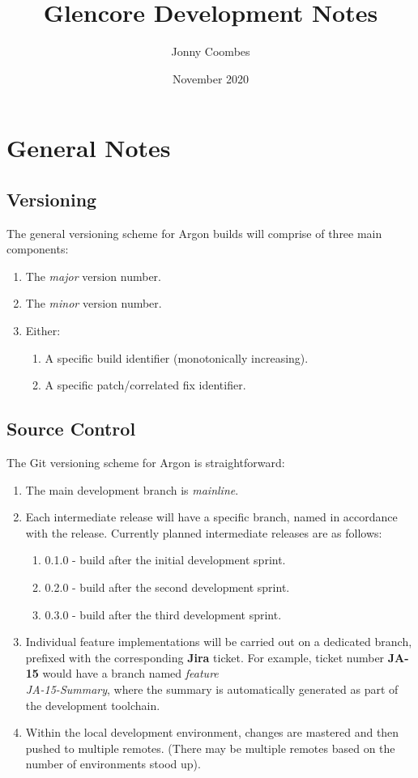 \documentclass{book}
\title{Glencore Development Notes}
\author{Jonny Coombes}
\date{November 2020}
\begin{document}
\maketitle
{}
\newpage
\tableofcontents
\newpage
{}

\chapter{General Notes}
\hoffset=0in
\evensidemargin=0in
\section{Versioning}
The general versioning scheme for Argon builds will comprise of three main components:
\begin{enumerate}
    \item The \textit{major} version number.
    \item The \textit{minor} version number.
    \item Either:
    \begin{enumerate}
        \item A specific build identifier (monotonically increasing).
        \item A specific patch/correlated fix identifier.
    \end{enumerate}
\end{enumerate}

\section{Source Control}
The Git versioning scheme for Argon is straightforward:
\begin{enumerate}
    \item The main development branch is \textit{mainline}.
    \item Each intermediate release will have a specific branch, named in accordance with the release.  Currently planned intermediate releases are as follows:
    \begin{enumerate}
        \item 0.1.0 - build after the initial development sprint.
        \item 0.2.0 - build after the second development sprint.
        \item 0.3.0 - build after the third development sprint.
    \end{enumerate}
    \item Individual feature implementations will be carried out on a dedicated branch, prefixed with the corresponding \textbf{Jira} ticket.  For example, ticket number \textbf{JA-15} would have a branch named \textit{feature\\JA-15-Summary}, where the summary is automatically generated as part of the development toolchain.
    \item Within the local development environment, changes are mastered and then pushed to multiple remotes.  (There may be multiple remotes based on the number of environments stood up).
\end{enumerate}
\end{document}
